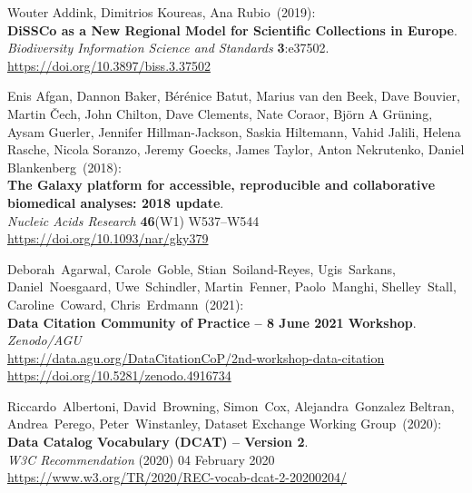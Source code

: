 
\makeatletter
{}

\begin{thebibliography}{9}

\small

Wouter Addink, Dimitrios Koureas, Ana Rubio~(2019):\\
\textbf{DiSSCo as a New Regional Model for Scientific Collections in Europe}.\\
\emph{Biodiversity Information Science and Standards}
\textbf{3}:e37502.\\
\url{https://doi.org/10.3897/biss.3.37502}

Enis Afgan, Dannon Baker, Bérénice Batut, Marius van
den Beek, Dave Bouvier, Martin Čech, John Chilton, Dave Clements, Nate
Coraor, Björn A Grüning, Aysam Guerler, Jennifer Hillman-Jackson, Saskia
Hiltemann, Vahid Jalili, Helena Rasche, Nicola Soranzo, Jeremy Goecks,
James Taylor, Anton Nekrutenko, Daniel Blankenberg~(2018):\\
\textbf{The Galaxy platform for accessible, reproducible and
collaborative biomedical analyses: 2018 update}.\\
\emph{Nucleic Acids Research} \textbf{46}(W1) W537--W544\\
\url{https://doi.org/10.1093/nar/gky379}

Deborah~Agarwal, Carole~Goble, Stian~Soiland-Reyes,
Ugis~Sarkans, Daniel~Noesgaard, Uwe~Schindler, Martin~Fenner,
Paolo~Manghi, Shelley~Stall, Caroline~Coward, Chris~Erdmann~(2021):\\
\textbf{Data Citation Community of Practice -- 8 June 2021 Workshop}.\\
\emph{Zenodo/AGU}\\
\url{https://data.agu.org/DataCitationCoP/2nd-workshop-data-citation}\\
\url{https://doi.org/10.5281/zenodo.4916734}

Riccardo~Albertoni, David~Browning, Simon~Cox,
Alejandra~Gonzalez Beltran, Andrea~Perego, Peter~Winstanley, Dataset
Exchange Working Group~(2020):\\
\textbf{Data Catalog Vocabulary (DCAT) -- Version 2}.\\
\emph{W3C Recommendation} (2020)  04 February 2020 \\
\url{https://www.w3.org/TR/2020/REC-vocab-dcat-2-20200204/}


\end{thebibliography}
